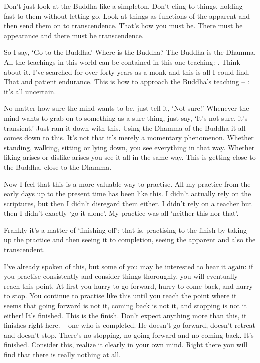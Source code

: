 Don't just look at the Buddha like a simpleton. Don't cling to things, holding fast to them without letting go. Look at things as functions of the apparent and then send them on to transcendence. That's how you must be. There must be appearance and there must be transcendence. 

So I say, `Go to the Buddha.' Where is the Buddha? The Buddha is the Dhamma. All the teachings in this world can be contained in this one teaching: . Think about it. I've searched for over forty years as a monk and this is all I could find. That and patient endurance. This is how to approach the Buddha's teaching -- : it's all uncertain. 

No matter how sure the mind wants to be, just tell it, `Not sure!' Whenever the mind wants to grab on to something as a sure thing, just say, `It's not sure, it's transient.' Just ram it down with this. Using the Dhamma of the Buddha it all comes down to this.  It's not that it's merely a momentary phenomenon. Whether standing, walking, sitting or lying down, you see everything in that way. Whether liking arises or dislike arises you see it all in the same way. This is getting close to the Buddha, close to the Dhamma. 

Now I feel that this is a more valuable way to practise. All my practice from the early days up to the present time has been like this. I didn't actually rely on the scriptures, but then I didn't disregard them either. I didn't rely on a teacher but then I didn't exactly `go it alone'. My practice was all `neither this nor that'. 

Frankly it's a matter of `finishing off'; that is, practising to the finish by taking up the practice and then seeing it to completion, seeing the apparent and also the transcendent. 

I've already spoken of this, but some of you may be interested to hear it again: if you practise consistently and consider things thoroughly, you will eventually reach this point. At first you hurry to go forward, hurry to come back, and hurry to stop. You continue to practise like this until you reach the point where it seems that going forward is not it, coming back is not it, and stopping is not it either! It's finished. This is the finish. Don't expect anything more than this, it finishes right here.  -- one who is completed. He doesn't go forward, doesn't retreat and doesn't stop. There's no stopping, no going forward and no coming back. It's finished. Consider this, realize it clearly in your own mind. Right there you will find that there is really nothing at all. 

